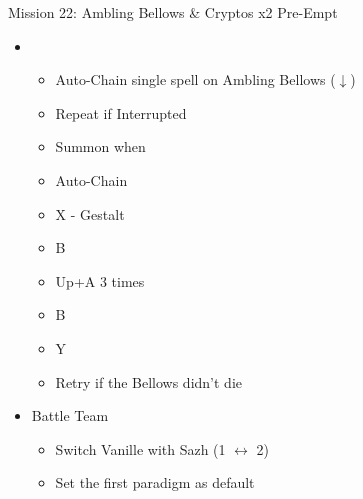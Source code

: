 	\begin{battle}[0:26]{Mission 22: Ambling Bellows \& Cryptos x2 Pre-Empt}
		\begin{itemize}
			\item \second
			      \begin{itemize}
				      \item Auto-Chain single spell on Ambling Bellows ($\downarrow$)
				      \item Repeat if Interrupted
				      \item Summon when \stagger\
				      \item Auto-Chain
				      \item X - Gestalt
				      \item B
				      \item Up+A 3 times
				      \item B
				      \item Y
				      \item Retry if the Bellows didn't die
			      \end{itemize}
		\end{itemize}
	\end{battle}

	\renewcommand{\sixth}{[6] Aggression (\com/\rav/\com)}

	\begin{menu}
		\begin{itemize}
			\paradigm
			\begin{itemize}
				\item Battle Team
				      \begin{itemize}
					      \item Switch Vanille with Sazh (1 $\leftrightarrow$ 2)
					      \item Set the first paradigm as default
				      \end{itemize}
			\end{itemize}
		\end{itemize}
	\end{menu}
	
